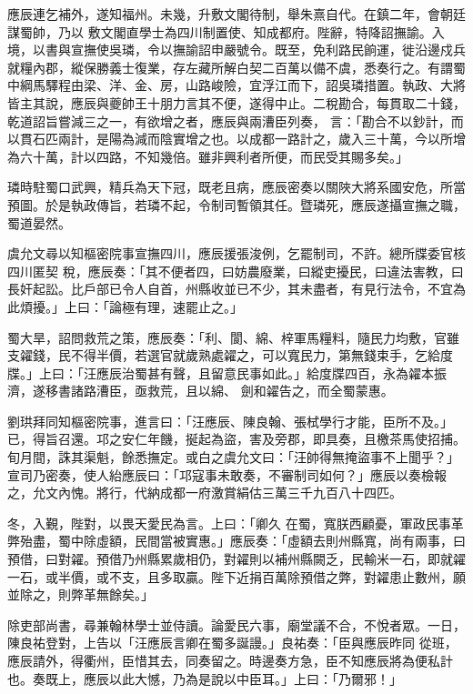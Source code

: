 \begin{pinyinscope}
 應辰連乞補外，遂知福州。未幾，升敷文閣待制，舉朱熹自代。在鎮二年，會朝廷謀蜀帥，乃以
 敷文閣直學士為四川制置使、知成都府。陛辭，特降詔撫諭。入境，以書與宣撫使吳璘，令以撫諭詔申嚴號令。既至，免利路民餉運，徙沿邊戍兵就糧內郡，縱保勝義士復業，存左藏所解白契二百萬以備不虞，悉奏行之。有謂蜀中綱馬驛程由梁、洋、金、房，山路峻險，宜浮江而下，詔吳璘措置。執政、大將皆主其說，應辰與夔帥王十朋力言其不便，遂得中止。二稅勘合，每貫取二十錢，乾道詔旨嘗減三之一，有欲增之者，應辰與兩漕臣列奏，
 言：「勘合不以鈔計，而以貫石匹兩計，是陽為減而陰實增之也。以成都一路計之，歲入三十萬，今以所增為六十萬，計以四路，不知幾倍。雖非興利者所便，而民受其賜多矣。」



 璘時駐蜀口武興，精兵為天下冠，既老且病，應辰密奏以關陜大將系國安危，所當預圖。於是執政傳旨，若璘不起，令制司暫領其任。暨璘死，應辰遂攝宣撫之職，蜀道晏然。



 虞允文尋以知樞密院事宣撫四川，應辰援張浚例，乞罷制司，不許。總所牒委官核四川匿契
 稅，應辰奏：「其不便者四，曰妨農廢業，曰縱吏擾民，曰違法害教，曰長奸起訟。比戶部已令人自首，州縣收並已不少，其未盡者，有見行法令，不宜為此煩擾。」上曰：「論極有理，速罷止之。」



 蜀大旱，詔問救荒之策，應辰奏：「利、閬、綿、梓軍馬糧料，隨民力均敷，官雖支糴錢，民不得半價，若選官就歲熟處糴之，可以寬民力，第無錢束手，乞給度牒。」上曰：「汪應辰治蜀甚有聲，且留意民事如此。」給度牒四百，永為糴本振濟，遂移書諸路漕臣，亟救荒，且以綿、
 劍和糴告之，而全蜀蒙惠。



 劉珙拜同知樞密院事，進言曰：「汪應辰、陳良翰、張栻學行才能，臣所不及。」已，得旨召還。邛之安仁年饑，挻起為盜，害及旁郡，即具奏，且檄茶馬使招捕。旬月間，誅其渠魁，餘悉撫定。或白之虞允文曰：「汪帥得無掩盜事不上聞乎？」宣司乃密奏，使人紿應辰曰：「邛寇事未敢奏，不審制司如何？」應辰以奏檢報之，允文內愧。將行，代納成都一府激賞絹估三萬三千九百八十四匹。



 冬，入覲，陛對，以畏天愛民為言。上曰：「卿久
 在蜀，寬朕西顧憂，軍政民事革弊殆盡，蜀中除虛額，民間當被實惠。」應辰奏：「虛額去則州縣寬，尚有兩事，曰預借，曰對糴。預借乃州縣累歲相仍，對糴則以補州縣闕乏，民輸米一石，即就糴一石，或半價，或不支，且多取贏。陛下近捐百萬除預借之弊，對糴患止數州，願並除之，則弊革無餘矣。」



 除吏部尚書，尋兼翰林學士並侍讀。論愛民六事，廟堂議不合，不悅者眾。一日，陳良祐登對，上告以「汪應辰言卿在蜀多誕謾。」良祐奏：「臣與應辰昨同
 從班，應辰請外，得衢州，臣惜其去，同奏留之。時邊奏方急，臣不知應辰將為便私計也。奏既上，應辰以此大憾，乃為是說以中臣耳。」上曰：「乃爾邪！」




\end{pinyinscope}
